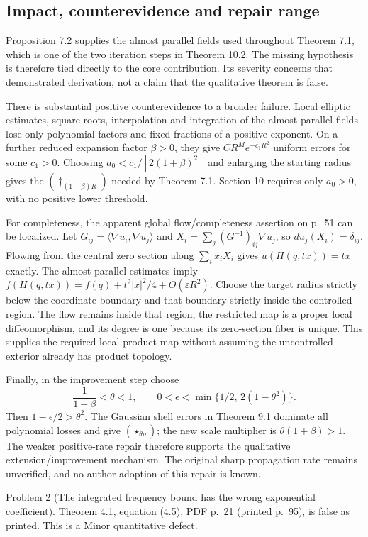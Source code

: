 \documentclass[10pt]{article}
\begin{document}
\subsection*{Impact, counterevidence and repair range}
Proposition 7.2 supplies the almost parallel fields used throughout Theorem 7.1, which is one of the two iteration steps in Theorem 10.2. The missing hypothesis is therefore tied directly to the core contribution. Its severity concerns that demonstrated derivation, not a claim that the qualitative theorem is false.\par
There is substantial positive counterevidence to a broader failure. Local elliptic estimates, square roots, interpolation and integration of the almost parallel fields lose only polynomial factors and fixed fractions of a positive exponent. On a further reduced expansion factor \(\beta>0\), they give \(CR^M e^{-c_1R^2}\) uniform errors for some \(c_1>0\). Choosing \(a_0<c_1/[2(1+\beta)^2]\) and enlarging the starting radius gives the \((\dagger_{(1+\beta)R})\) needed by Theorem 7.1. Section 10 requires only \(a_0>0\), with no positive lower threshold.\par
For completeness, the apparent global flow/completeness assertion on p. 51 can be localized. Let \(G_{ij}=\langle\nabla u_i,\nabla u_j\rangle\) and \(X_i=\sum_j(G^{-1})_{ij}\nabla u_j\), so \(du_j(X_i)=\delta_{ij}\). Flowing from the central zero section along \(\sum_i x_iX_i\) gives \(u(H(q,tx))=tx\) exactly. The almost parallel estimates imply \(f(H(q,tx))=f(q)+t^2|x|^2/4+O(\varepsilon R^2)\). Choose the target radius strictly below the coordinate boundary and that boundary strictly inside the controlled region. The flow remains inside that region, the restricted map is a proper local diffeomorphism, and its degree is one because its zero-section fiber is unique. This supplies the required local product map without assuming the uncontrolled exterior already has product topology.\par
Finally, in the improvement step choose \[\frac1{1+\beta}<\theta<1,\qquad
 0<\epsilon<\min\{1/2,\,2(1-\theta^2)\}.\] Then \(1-\epsilon/2>\theta^2\). The Gaussian shell errors in Theorem 9.1 dominate all polynomial losses and give \((\star_{\theta\rho})\); the new scale multiplier is \(\theta(1+\beta)>1\). The weaker positive-rate repair therefore supports the qualitative extension/improvement mechanism. The original sharp propagation rate remains unverified, and no author adoption of this repair is known.\par
Problem 2 (The integrated frequency bound has the wrong exponential coefficient).  Theorem 4.1, equation (4.5), PDF p. 21 (printed p. 95), is false as printed. This is a Minor quantitative defect.\par
\end{document}
